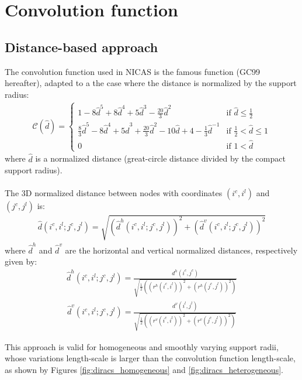\documentclass[12pt]{scrartcl}
\begin{document}
\section{Convolution function}

\subsection{Distance-based approach}
The convolution function used in NICAS is the famous \citet{gaspari_1999} function (GC99 hereafter), adapted to a the case where the distance is normalized by the support radius:
\begin{align}
\mathcal{C}(\widehat{d}) = \left\{
\begin{array}{ll}
\displaystyle
1 - 8 \widehat{d}^5 + 8 \widehat{d}^4 + 5 \widehat{d}^3 - \frac{20}{3} \widehat{d}^2 & \displaystyle \text{if }\widehat{d} \le \frac{1}{2} \\[2ex]
\displaystyle
\frac{8}{3} \widehat{d}^5 - 8 \widehat{d}^4 + 5 \widehat{d}^3 + \frac{20}{3} \widehat{d}^2 - 10 \widehat{d} + 4 - \frac{1}{3} \widehat{d}^{-1} & \displaystyle \text{if }\frac{1}{2} < \widehat{d} \le 1 \\[2ex]
\displaystyle
0 & \text{if } 1 < \widehat{d}
\end{array} \right.
\end{align}                 
where $\widehat{d}$ is a normalized distance (great-circle distance divided by the compact support radius).\\
$  $\\
The 3D normalized distance between nodes with coordinates $(i^c,i^l)$ and $(j^c,j^l)$ is:
\begin{align}
\widehat{d}(i^c,i^l;j^c,j^l) = \sqrt{\left(\widehat{d}^h(i^c,i^l;j^c,j^l)\right)^2+\left(\widehat{d}^v(i^c,i^l;j^c,j^l)\right)^2}
\end{align}
where $\widehat{d}^h$ and $\widehat{d}^v$ are the horizontal and vertical normalized distances, respectively given by:
\begin{align}
\widehat{d}^h(i^c,i^l;j^c,j^l) = \frac{d^h(i^c,j^c)}{\displaystyle \sqrt{\frac{1}{2}\left(\left(r^h(i^c,i^l)\right)^2+\left(r^h(j^c,j^l)\right)^2\right)}}
\end{align}
\begin{align}
\widehat{d}^v(i^c,i^l;j^c,j^l) = \frac{d^v(i^l,j^l)}{\displaystyle \sqrt{\frac{1}{2}\left(\left(r^v(i^c,i^l)\right)^2+\left(r^v(j^c,j^l)\right)^2\right)}}
\end{align}

This approach is valid for homogeneous and smoothly varying support radii, whose variations length-scale is larger than the convolution function length-scale, as shown by Figures \ref{fig:diracs_homogeneous} and \ref{fig:diracs_heterogeneous}.
\end{document}
